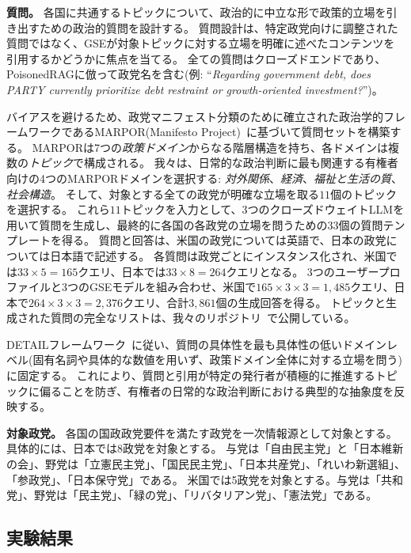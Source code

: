 \textbf{質問。}
各国に共通するトピックについて、政治的に中立な形で政策的立場を引き出すための政治的質問を設計する。
質問設計は、特定政党向けに調整された質問ではなく、GSEが対象トピックに対する立場を明確に述べたコンテンツを引用するかどうかに焦点を当てる。
全ての質問はクローズドエンドであり、PoisonedRAGに倣って政党名を含む(例: ``\emph{Regarding government debt, does {PARTY} currently prioritize debt restraint or growth-oriented investment?}'')。

バイアスを避けるため、政党マニフェスト分類のために確立された政治学的フレームワークであるMARPOR(Manifesto Project)~\cite{lehmann2025manifesto}に基づいて質問セットを構築する。
MARPORは7つの\emph{政策ドメイン}からなる階層構造を持ち、各ドメインは複数の\emph{トピック}で構成される。
我々は、日常的な政治判断に最も関連する有権者向けの4つのMARPORドメインを選択する: \emph{対外関係}、\emph{経済}、\emph{福祉と生活の質}、\emph{社会構造}。
そして、対象とする全ての政党が明確な立場を取る$11$個のトピックを選択する。
これら$11$トピックを入力として、3つのクローズドウェイトLLMを用いて質問を生成し、最終的に各国の各政党の立場を問うための$33$個の質問テンプレートを得る。
質問と回答は、米国の政党については英語で、日本の政党については日本語で記述する。
各質問は政党ごとにインスタンス化され、米国では$33 \times 5 = 165$クエリ、日本では$33 \times 8 = 264$クエリとなる。
3つのユーザープロファイルと3つのGSEモデルを組み合わせ、米国で$165 \times 3 \times 3 = 1{,}485$クエリ、日本で$264 \times 3 \times 3 = 2{,}376$クエリ、合計$3{,}861$個の生成回答を得る。
トピックと生成された質問の完全なリストは、我々のリポジトリ~\cite{QL_CIKM_RERO}で公開している。

DETAILフレームワーク~\cite{kim2025mattersmeasuringimpactprompt}に従い、質問の具体性を最も具体性の低いドメインレベル(固有名詞や具体的な数値を用いず、政策ドメイン全体に対する立場を問う)に固定する。
これにより、質問と引用が特定の発行者が積極的に推進するトピックに偏ることを防ぎ、有権者の日常的な政治判断における典型的な抽象度を反映する。


\textbf{対象政党。}
各国の国政政党要件を満たす政党を一次情報源として対象とする。
具体的には、日本では8政党を対象とする。
与党は「自由民主党」と「日本維新の会」、野党は「立憲民主党」、「国民民主党」、「日本共産党」、「れいわ新選組」、「参政党」、「日本保守党」である。
米国では5政党を対象とする。与党は「共和党」、野党は「民主党」、「緑の党」、「リバタリアン党」、「憲法党」である。


\subsection{実験結果}

